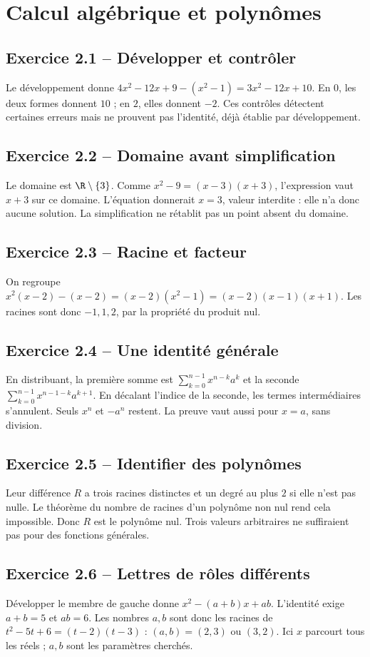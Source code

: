 \chapter{Calcul algébrique et polynômes}
\section*{Exercice 2.1 -- Développer et contrôler}
Le développement donne $4x^2-12x+9-(x^2-1)=3x^2-12x+10$. En $0$, les deux formes donnent $10$ ; en $2$, elles donnent $-2$. Ces contrôles détectent certaines erreurs mais ne prouvent pas l'identité, déjà établie par développement.

\section*{Exercice 2.2 -- Domaine avant simplification}
Le domaine est $\R\setminus\{3\}$. Comme $x^2-9=(x-3)(x+3)$, l'expression vaut $x+3$ sur ce domaine. L'équation donnerait $x=3$, valeur interdite : elle n'a donc aucune solution. La simplification ne rétablit pas un point absent du domaine.

\section*{Exercice 2.3 -- Racine et facteur}
On regroupe $x^2(x-2)-(x-2)=(x-2)(x^2-1)=(x-2)(x-1)(x+1)$. Les racines sont donc $-1,1,2$, par la propriété du produit nul.

\section*{Exercice 2.4 -- Une identité générale}
En distribuant, la première somme est $\sum_{k=0}^{n-1}x^{n-k}a^k$ et la seconde $\sum_{k=0}^{n-1}x^{n-1-k}a^{k+1}$. En décalant l'indice de la seconde, les termes intermédiaires s'annulent. Seuls $x^n$ et $-a^n$ restent. La preuve vaut aussi pour $x=a$, sans division.

\section*{Exercice 2.5 -- Identifier des polynômes}
Leur différence $R$ a trois racines distinctes et un degré au plus $2$ si elle n'est pas nulle. Le théorème du nombre de racines d'un polynôme non nul rend cela impossible. Donc $R$ est le polynôme nul. Trois valeurs arbitraires ne suffiraient pas pour des fonctions générales.

\section*{Exercice 2.6 -- Lettres de rôles différents}
Développer le membre de gauche donne $x^2-(a+b)x+ab$. L'identité exige $a+b=5$ et $ab=6$. Les nombres $a,b$ sont donc les racines de $t^2-5t+6=(t-2)(t-3)$ : $(a,b)=(2,3)$ ou $(3,2)$. Ici $x$ parcourt tous les réels ; $a,b$ sont les paramètres cherchés.
